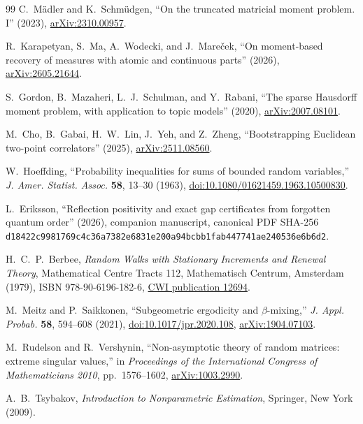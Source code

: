 \documentclass[11pt]{article}
\theoremstyle{definition}
\theoremstyle{remark}
\begin{document}
\begin{thebibliography}{99}
C.~M\"adler and K.~Schm\"udgen,
``On the truncated matricial moment problem. I'' (2023),
\href{https://arxiv.org/abs/2310.00957}{arXiv:2310.00957}.

R.~Karapetyan, S.~Ma, A.~Wodecki, and J.~Mare\v{c}ek,
``On moment-based recovery of measures with atomic and continuous parts''
(2026), \href{https://arxiv.org/abs/2605.21644}{arXiv:2605.21644}.

S.~Gordon, B.~Mazaheri, L.~J.~Schulman, and Y.~Rabani,
``The sparse Hausdorff moment problem, with application to topic models''
(2020), \href{https://arxiv.org/abs/2007.08101}{arXiv:2007.08101}.

M.~Cho, B.~Gabai, H.~W.~Lin, J.~Yeh, and Z.~Zheng,
``Bootstrapping Euclidean two-point correlators'' (2025),
\href{https://arxiv.org/abs/2511.08560}{arXiv:2511.08560}.

W.~Hoeffding, ``Probability inequalities for sums of bounded random
variables,'' \emph{J. Amer. Statist. Assoc.} \textbf{58}, 13--30 (1963),
\href{https://doi.org/10.1080/01621459.1963.10500830}{doi:10.1080/01621459.1963.10500830}.

L.~Eriksson, ``Reflection positivity and exact gap certificates from forgotten
quantum order'' (2026), companion manuscript, canonical PDF SHA-256
\nolinkurl{d18422c9981769c4c36a7382e6831e200a94bcbb1fab447741ae240536e6b6d2}.

H.~C.~P.~Berbee, \emph{Random Walks with Stationary Increments and Renewal
Theory}, Mathematical Centre Tracts 112, Mathematisch Centrum, Amsterdam
(1979), ISBN 978-90-6196-182-6,
\href{https://ir.cwi.nl/pub/12694}{CWI publication 12694}.

M.~Meitz and P.~Saikkonen, ``Subgeometric ergodicity and $\beta$-mixing,''
\emph{J. Appl. Probab.} \textbf{58}, 594--608 (2021),
\href{https://doi.org/10.1017/jpr.2020.108}{doi:10.1017/jpr.2020.108},
\href{https://arxiv.org/abs/1904.07103}{arXiv:1904.07103}.

M.~Rudelson and R.~Vershynin,
``Non-asymptotic theory of random matrices: extreme singular values,''
in \emph{Proceedings of the International Congress of Mathematicians 2010},
pp.~1576--1602,
\href{https://arxiv.org/abs/1003.2990}{arXiv:1003.2990}.

A.~B.~Tsybakov, \emph{Introduction to Nonparametric Estimation},
Springer, New York (2009).


\end{thebibliography}
\end{document}
